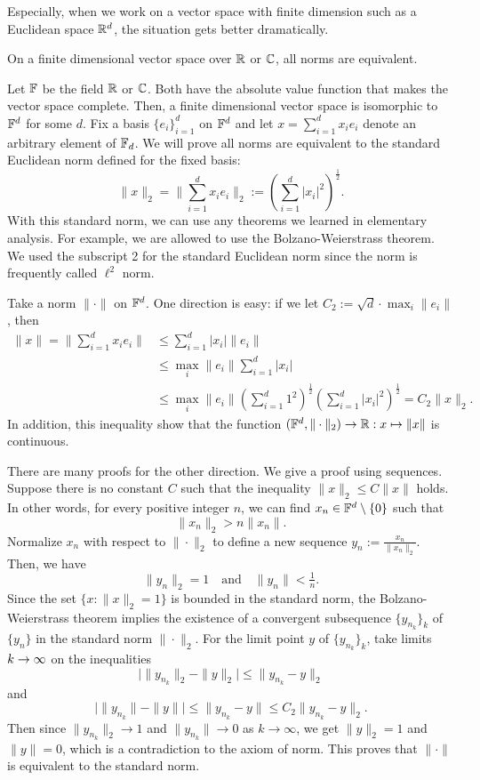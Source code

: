 Especially, when we work on a vector space with finite dimension such as a Euclidean space $\mathbb{R}^d$, the situation gets better dramatically.

\begin{thm}\label{thm:equivalent norms on finite dimension}
On a finite dimensional vector space over $\mathbb{R}$ or $\mathbb{C}$, all norms are equivalent.
\end{thm}
\begin{pf}
Let $\mathbb{F}$ be the field $\mathbb{R}$ or $\mathbb{C}$.
Both have the absolute value function that makes the vector space complete.
Then, a finite dimensional vector space is isomorphic to $\mathbb{F}^d$ for some $d$.
Fix a basis $\{e_i\}_{i=1}^d$ on $\mathbb{F}^d$ and let $x=\sum_{i=1}^dx_ie_i$ denote an arbitrary element of $\mathbb{F}_d$.
We will prove all norms are equivalent to the standard Euclidean norm defined for the fixed basis:
\[\|x\|_2=\|\sum_{i=1}^dx_ie_i\|_2:=\left(\sum_{i=1}^d|x_i|^2\right)^{\frac12}.\]
With this standard norm, we can use any theorems we learned in elementary analysis.
For example, we are allowed to use the Bolzano-Weierstrass theorem.
We used the subscript 2 for the standard Euclidean norm since the norm is frequently called $\ell^2$ norm.

Take a norm $\|\cdot\|$ on $\mathbb{F}^d$.
One direction is easy: if we let $C_2:=\sqrt{d}\cdot\max_i\|e_i\|$, then
\begin{align*}
\|x\|=\|\sum_{i=1}^dx_ie_i\|&\le\sum_{i=1}^d|x_i|\|e_i\|\\
&\le\max_i\|e_i\|\sum_{i=1}^d|x_i|\\
&\le\max_i\|e_i\|\left(\sum_{i=1}^d1^2\right)^{\frac12}\left(\sum_{i=1}^d|x_i|^2\right)^{\frac12}=C_2\|x\|_2.
\end{align*}
In addition, this inequality show that the function $(\F^d,\|\cdot\|_2)\to\R:x\mapsto\|x\|$ is continuous.

There are many proofs for the other direction.
We give a proof using sequences.
Suppose there is no constant $C$ such that the inequality $\|x\|_2\le C\|x\|$ holds.
In other words, for every positive integer $n$, we can find $x_n\in\mathbb{F}^d\setminus\{0\}$ such that
\[\|x_n\|_2>n\|x_n\|.\]
Normalize $x_n$ with respect to $\|\cdot\|_2$ to define a new sequence $y_n:=\frac{x_n}{\|x_n\|_2}$.
Then, we have
\[\|y_n\|_2=1\quad\text{and}\quad\|y_n\|<\tfrac1n.\]
Since the set $\{x:\|x\|_2=1\}$ is bounded in the standard norm, the Bolzano-Weierstrass theorem implies the existence of a convergent subsequence $\{y_{n_k}\}_k$ of $\{y_n\}$ in the standard norm $\|\cdot\|_2$.
For the limit point $y$ of $\{y_{n_k}\}_k$, take limits $k\to\oo$ on the inequalities
\[\bigl|\|y_{n_k}\|_2-\|y\|_2\bigr|\le\|y_{n_k}-y\|_2\]
and
\[\bigl|\|y_{n_k}\|-\|y\|\bigr|\le\|y_{n_k}-y\|\le C_2\|y_{n_k}-y\|_2.\]
Then since $\|y_{n_k}\|_2\to1$ and $\|y_{n_k}\|\to0$ as $k\to\infty$, we get $\|y\|_2=1$ and $\|y\|=0$, which is a contradiction to the axiom of norm.
This proves that $\|\cdot\|$ is equivalent to the standard norm.
\end{pf}

